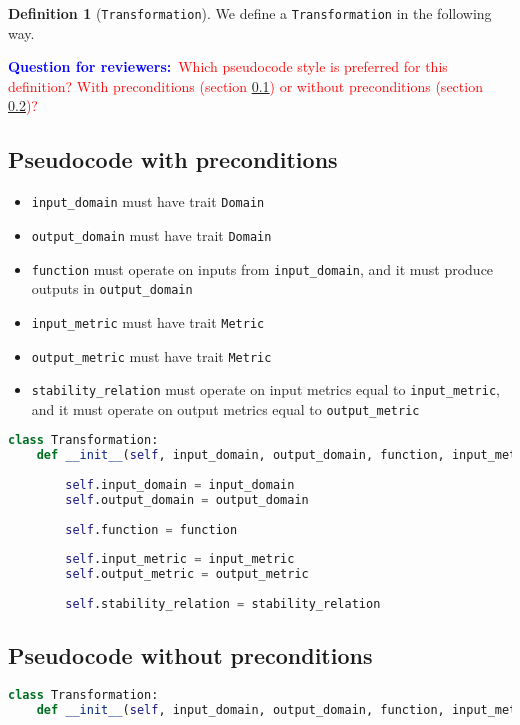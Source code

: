 \documentclass[11pt,a4paper]{article}
\theoremstyle{definition}
\newtheorem{definition}[theorem]{Definition}
\newcommand{\questionr}[1]{\textcolor{blue}{\textbf{Question for reviewers:}}\textcolor{red}{~#1}}
\begin{document}
\begin{definition}[\texttt{Transformation}]
    We define a \texttt{Transformation} in the following way.
    
    \questionr{Which pseudocode style is preferred for this definition? With preconditions (section \ref{sec:pseudocode-w-preconditions}) or without preconditions (section \ref{sec:pseudocode-wout-preconditions})?}
    
\subsection{Pseudocode with preconditions}
\label{sec:pseudocode-w-preconditions}

\begin{itemize}
    \item \texttt{input\_domain} must have trait \texttt{Domain}
    \item \texttt{output\_domain} must have trait \texttt{Domain}
    \item \texttt{function} must operate on inputs from \texttt{input\_domain}, and it must produce outputs in \texttt{output\_domain}
    \item \texttt{input\_metric} must have trait \texttt{Metric}
    \item \texttt{output\_metric} must have trait \texttt{Metric}
    \item \texttt{stability\_relation} must operate on input metrics equal to \texttt{input\_metric}, and it must operate on output metrics equal to \texttt{output\_metric}
\end{itemize}

\begin{lstlisting}[language=Python]
class Transformation:
    def __init__(self, input_domain, output_domain, function, input_metric, output_metric, stability_relation):
    	
        self.input_domain = input_domain
        self.output_domain = output_domain
        
        self.function = function
        
        self.input_metric = input_metric
        self.output_metric = output_metric
        
        self.stability_relation = stability_relation
\end{lstlisting}
    
\subsection{Pseudocode without preconditions}
\label{sec:pseudocode-wout-preconditions}
\begin{lstlisting}[language=Python]
class Transformation:
    def __init__(self, input_domain, output_domain, function, input_metric, output_metric, stability_relation):
    	

\end{lstlisting}
\end{definition}
\end{document}
